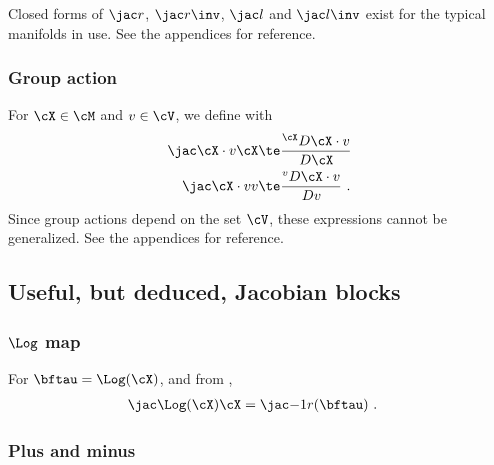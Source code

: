 Closed forms of $\mjac{}{r}$, $\mjac{}{r}\inv$, $\mjac{}{l}$ and $\mjac{}{l}\inv$ exist for the typical manifolds in use. 
See the appendices for reference.


\subsubsection{Group action}


For $\cX\in\cM$ and $v\in\cV$, we define with  
%
\begin{align}
\mjac{\cX\cdot v}{\cX} &\te \rdpar{\cX\cdot v}{\cX} \\
\mjac{\cX\cdot v}{v}  &\te \rdpar{\cX\cdot v}{v} 
~.
\end{align}
%
Since group actions depend on the set $\cV$, these expressions cannot be generalized. 
See the appendices for reference.



\subsection{Useful, but deduced, Jacobian blocks}

\subsubsection[Log map]{$\Log$ map}

For $\bftau=\Log(\cX)$,
and from , 
%
\begin{align}\label{equ:Jac_log}
\mjac{\Log(\cX)}{\cX} 
&= \mjac{-1}{r}(\bftau) 
~.
\end{align}

\subsubsection{Plus and minus}

